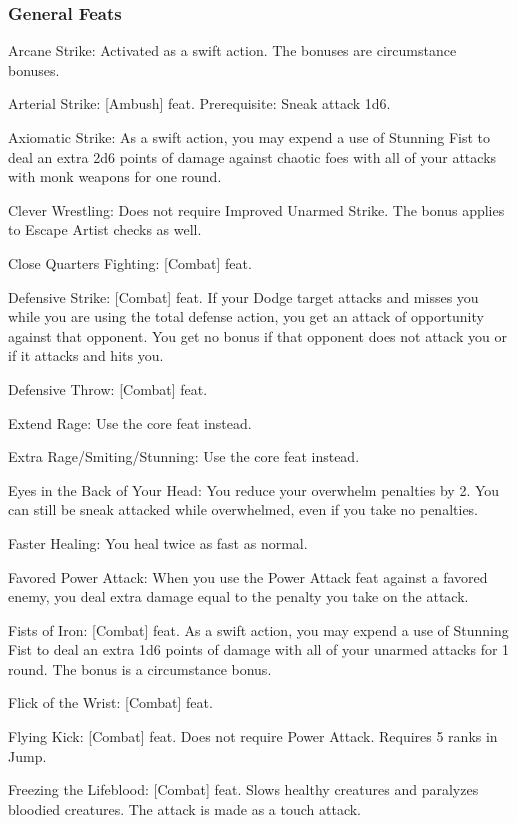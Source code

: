 \subsubsection{General Feats}
\begin{itemize*}
\item Arcane Strike: Activated as a swift action. The bonuses are circumstance bonuses.
\item Arterial Strike: [Ambush] feat. Prerequisite: Sneak attack \plus1d6.
\item Axiomatic Strike: As a swift action, you may expend a use of Stunning Fist to deal an extra 2d6 points of damage against chaotic foes with all of your attacks with monk weapons for one round.
\item Clever Wrestling: Does not require Improved Unarmed Strike. The bonus applies to Escape Artist checks as well.
\item Close Quarters Fighting: [Combat] feat.
\item Defensive Strike: [Combat] feat. If your Dodge target attacks and misses you while you are using the total defense action, you get an attack of opportunity against that opponent. You get no bonus if that opponent does not attack you or if it attacks and hits you.
\item Defensive Throw: [Combat] feat.
\item Extend Rage: Use the core feat instead.
\item Extra Rage/Smiting/Stunning: Use the core feat instead.
\item Eyes in the Back of Your Head: You reduce your overwhelm penalties by 2. You can still be sneak attacked while overwhelmed, even if you take no penalties.
\item Faster Healing: You heal twice as fast as normal.
\item Favored Power Attack: When you use the Power Attack feat against a favored enemy, you deal extra damage equal to the penalty you take on the attack.
\item Fists of Iron: [Combat] feat. As a swift action, you may expend a use of Stunning Fist to deal an extra 1d6 points of damage with all of your unarmed attacks for 1 round. The bonus is a circumstance bonus.
\item Flick of the Wrist: [Combat] feat.
\item Flying Kick: [Combat] feat. Does not require Power Attack. Requires 5 ranks in Jump.
\item Freezing the Lifeblood: [Combat] feat. Slows healthy creatures and paralyzes bloodied creatures. The attack is made as a touch attack.

\end{itemize*}
